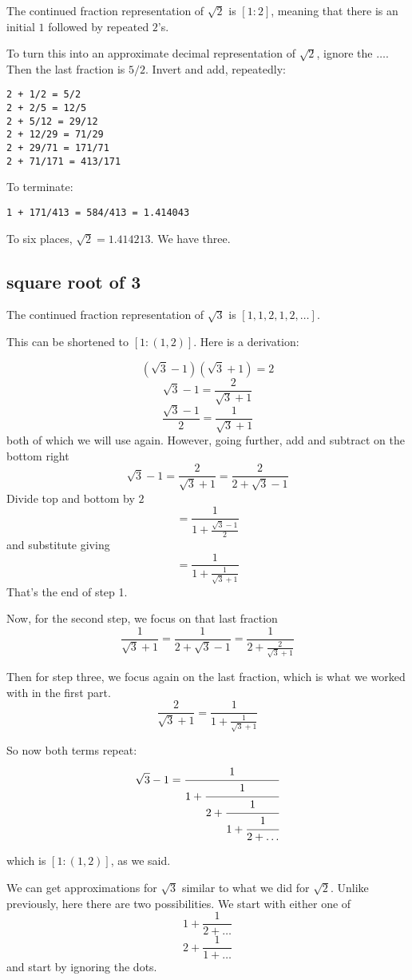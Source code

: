 \documentclass[11pt, oneside]{article}
\begin{document}
The continued fraction representation of $\sqrt{2}$ is $[1:2]$, meaning that there is an initial $1$ followed by repeated $2$'s.

To turn this into an approximate decimal representation of $\sqrt{2}$, ignore the $\dots$.  Then the last fraction is $5/2$.  Invert and add, repeatedly:

\begin{verbatim}
2 + 1/2 = 5/2
2 + 2/5 = 12/5
2 + 5/12 = 29/12
2 + 12/29 = 71/29
2 + 29/71 = 171/71
2 + 71/171 = 413/171
\end{verbatim}

To terminate:
\begin{verbatim}
1 + 171/413 = 584/413 = 1.414043
\end{verbatim}

To six places, $\sqrt{2} = 1.414213$.  We have three.

\subsection*{square root of 3}
The continued fraction representation of $\sqrt{3}$ is $[1,1,2,1,2, \dots]$.

This can be shortened to $[1:(1,2)]$.  Here is a derivation:

\[ (\sqrt{3} - 1)(\sqrt{3} + 1) = 2 \]
\[ \sqrt{3} - 1 = \frac{2}{\sqrt{3} + 1}   \]
\[ \frac{\sqrt{3} - 1}{2} = \frac{1}{\sqrt{3} + 1} \]
both of which we will use again.  However, going further, add and subtract on the bottom right
\[ \sqrt{3} - 1 = \frac{2}{\sqrt{3} + 1}  = \frac{2}{2 + \sqrt{3} - 1} \]
Divide top and bottom by $2$
\[ = \frac{1}{1 + \frac{\sqrt{3} - 1}{2}} \]
and substitute giving
\[= \frac{1}{1 + \frac{1}{\sqrt{3} +1}} \]
That's the end of step 1.

Now, for the second step, we focus on that last fraction
\[ \frac{1}{\sqrt{3} +1} = \frac{1}{2 + \sqrt{3} -1} = \frac{1}{2 + \frac{2}{\sqrt{3} + 1}} \]

Then for step three, we focus again on the last fraction, which is what we worked with in the first part.
\[ \frac{2}{\sqrt{3} + 1} = \frac{1}{1 + \frac{1}{\sqrt{3} +1}} \]

So now both terms repeat:
\[ \sqrt{3} - 1 = \cfrac{1}{1+\cfrac{1}{2+\cfrac{1}{1 + \cfrac{1}{2 + \dots }}}}  \]

which is $[1:(1,2)]$, as we said.

We can get approximations for $\sqrt{3}$ similar to what we did for $\sqrt{2}$.  Unlike previously, here there are two possibilities.  We start with either one of
\[ 1 + \frac{1}{2 + \dots} \]
\[ 2 + \frac{1}{1 + \dots} \]
and start by ignoring the dots.
\end{document}

